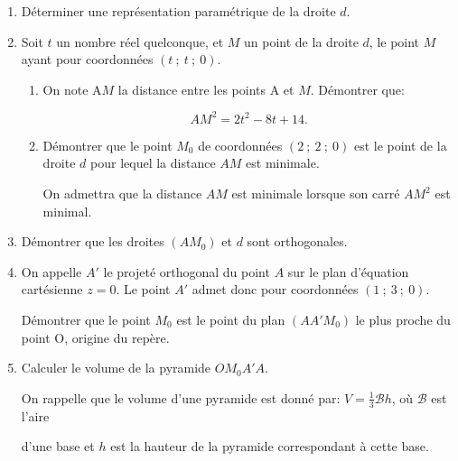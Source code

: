 \documentclass[10pt]{article}
\begin{document}
 \begin{enumerate}
\item  Déterminer une représentation paramétrique de la droite $d$. 

\item Soit $t$ un nombre réel quelconque, et $M$ un point de la droite $d$, le point $M$ ayant pour coordonnées $(t~;~t~;~0)$. 
\begin{enumerate}
\item  On note A$M$ la distance entre les points A et $M$. Démontrer que: 

\[AM^2 = 2t^2 - 8t+ 14.\] 

\item Démontrer que le point $M_0$ de coordonnées $(2~;~2~;~0)$ est le point de la droite $d$ pour lequel la distance $AM$ est minimale. 

On admettra que la distance $AM$ est minimale lorsque son carré $AM^2$ est minimal. 
\end{enumerate}
\item Démontrer que les droites $(AM_0)$ et $d$ sont orthogonales. 

\item On appelle $A'$ le projeté orthogonal du point $A$ sur le plan d'équation cartésienne $z = 0$. Le point $A'$ admet donc pour coordonnées $(1~;~3~;~0)$. 

Démontrer que le point $M_0$ est le point du plan $(AA'M_0)$ le plus proche du point O, origine du repère. 

\item Calculer le volume de la pyramide $OM_0A'A$. 

On rappelle que le volume d'une pyramide est donné par: $V = \frac{1}{3}\mathcal{B}h$, où $\mathcal{B}$ est l'aire  

d'une base et $h$ est la hauteur de la pyramide correspondant à cette base. 
\end{enumerate}

 \vspace{0.75cm}
\end{document}
